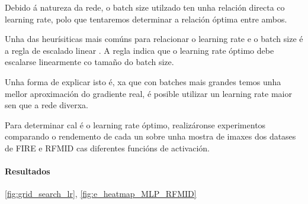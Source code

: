 Debido á natureza da rede, o batch size utilzado ten unha relación directa co learning rate, polo que tentaremos determinar a relación óptima entre ambos.

Unha das heurísiticas mais comúns para relacionar o learning rate e o batch size é a regla de escalado linear \cite{goyal2018accuratelargeminibatchsgd}. 
A regla indica que o learning rate óptimo debe escalarse linearmente co tamaño do batch size. 

Unha forma de explicar isto é, xa que con batches mais grandes temos unha mellor aproximación do gradiente real, é posible utilizar un learning rate maior sen que a rede diverxa.

Para determinar cal é o learning rate óptimo, realizáronse experimentos comparando o rendemento de cada un sobre unha mostra de imaxes dos datases de FIRE e RFMID cas diferentes funcións de activación.

\paragraph{Resultados}
\label{par:Resultados-learningrate}

\ref{fig:grid_search_lr}, \ref{fig:e_heatmap_MLP_RFMID}

